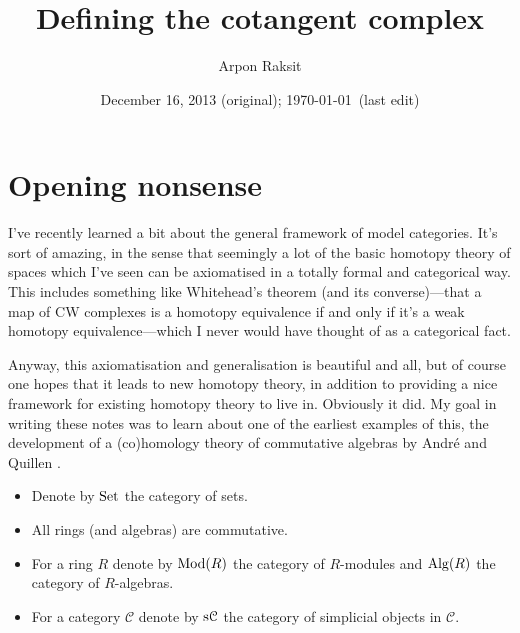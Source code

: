 



\renewcommand{\C}{\mathcal{C}}
\renewcommand{\L}{\mathbb{L}}
\newcommand{\ab}{\operatorname{ab}}
\newcommand{\Der}{\operatorname{Der}}


\title{Defining the cotangent complex}
\author{Arpon Raksit}
\date{December 16, 2013 (original); \today\ (last edit)}


\maketitle
\thispagestyle{fancy}



\section*{Opening nonsense}

I've recently learned a bit about the general framework of model
categories. It's sort of amazing, in the sense that seemingly a lot of
the basic homotopy theory of spaces which I've seen can be axiomatised
in a totally formal and categorical way. This includes something like
Whitehead's theorem (and its converse)---that a map of CW complexes is
a homotopy equivalence if and only if it's a weak homotopy
equivalence---which I never would have thought of as a categorical
fact.

Anyway, this axiomatisation and generalisation is beautiful and all,
but of course one hopes that it leads to new homotopy theory, in
addition to providing a nice framework for existing homotopy theory to
live in. Obviously it did. My goal in writing these notes was to learn
about one of the earliest examples of this, the development of a
(co)homology theory of commutative algebras by Andr\'{e}
\cite{andre-cotangent} and Quillen \cite{quillen-cotangent}.

\begin{notation-nonum}
  \begin{itemize}[leftmargin=*]
  \item Denote by $\mathrm{Set}$ the category of sets.
  \item All rings (and algebras) are commutative.
  \item For a ring $R$ denote by $\mathrm{Mod}(R)$ the category of $R$-modules
    and $\mathrm{Alg}(R)$ the category of $R$-algebras.
  \item For a category $\C$ denote by $\s\C$ the category of
    simplicial objects in $\C$.
  \end{itemize}
\end{notation-nonum}

